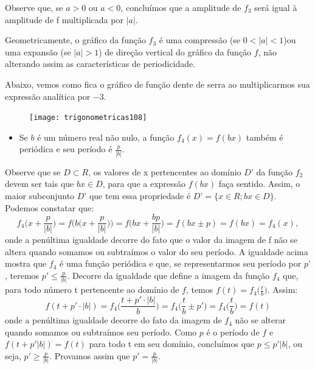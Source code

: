 Observe que, se $a >0$ ou $a < 0$, concluímos que a amplitude de $f_3$ será igual à amplitude de f multiplicada por $|a|$.

Geometricamente, o gráfico da função $f_3$ é uma compressão (se $0<|a|<1$)ou uma expansão (se $|a|>1$) de direção vertical do gráfico da função $f$, não alterando assim as características de periodicidade.

Abaixo, vemos como fica o gráfico de função dente de serra ao multiplicarmos sua expressão analítica por $-3$.

\begin{figure}[H]
\centering

\texttt{[image: trigonometricas108]}
\end{figure}

\begin{itemize}
\item Se $b$ é um número real não nulo, a função $f_4(x) = f(bx)$ também é periódica e seu período é $\frac{p}{|b|}$.
\end{itemize}

Observe que se $D\subset R$, os valores de x pertencentes ao domínio $D’$ da função $f_2$ devem ser tais que $bx\in D$, para que a expressão $f(bx)$ faça sentido. Assim, o maior subconjunto $D’$ que tem essa propriedade é $D’ = \{x \in R;bx\in D\}$.
 Podemos constatar que:
\begin{equation*}
f_4 \bigg(x+\frac{p}{|b|}\bigg)=f\bigg(b\bigg(x+\frac{p}{|b|}\bigg)\bigg)=f\bigg(bx+\frac{bp}{|b|}\bigg)=f(bx\pm p)=f(bx)=f_4 (x),
\end{equation*}
onde a penúltima igualdade decorre do fato que o valor da imagem de f não se altera quando somamos ou subtraímos o valor do seu período. A igualdade acima mostra que $f_4$ é uma função periódica e que, se representarmos seu período por $p’$, teremos $p'\leq \frac{p}{|b|}$. Decorre da igualdade que define a imagem da função $f_4$ que, para todo número t pertencente ao domínio de $f$, temos $f(t) =f_4 \big(\frac{t}{b}\big)$. Assim:
\begin{equation*}
f(t+p'\cdot|b|)=f_4 \bigg(\frac{t+p'\cdot|b|}{b}\bigg)=f_4 \bigg(\frac{t}{b}\pm p'\bigg)=f_4 \bigg(\frac{t}{b}\bigg)=f(t)
\end{equation*}
onde a penúltima igualdade decorre do fato da imagem de $f_4$ não se alterar quando somamos ou subtraímos seu período. Como $p$ é o período de $f$ e $f(t+p'|b|)= f(t)$ para todo t em seu domínio, concluímos que $p\leq p'|b|$, ou seja, $p'\geq \frac{p}{|b|}$. Provamos assim que $p'=\frac{p}{|b|}$.


